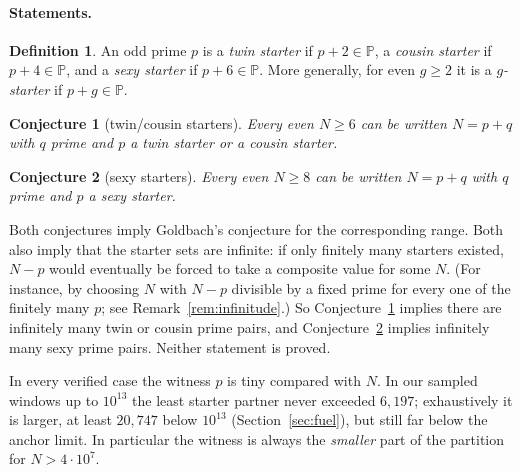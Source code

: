\documentclass[11pt]{article}
\newtheorem{conjecture}{Conjecture}
\theoremstyle{definition}
\newtheorem{definition}[theorem]{Definition}
\theoremstyle{remark}
\newcommand{\Pp}{\mathbb{P}}
\begin{document}
\paragraph{Statements.}

\begin{definition}
An odd prime $p$ is a \emph{twin starter} if $p+2\in\Pp$, a \emph{cousin
starter} if $p+4\in\Pp$, and a \emph{sexy starter} if $p+6\in\Pp$. More
generally, for even $g\ge 2$ it is a \emph{$g$-starter} if $p+g\in\Pp$.
\end{definition}

\begin{conjecture}[twin/cousin starters]\label{conj:A}
Every even $N\ge 6$ can be written $N=p+q$ with $q$ prime and $p$ a twin
starter or a cousin starter.
\end{conjecture}

\begin{conjecture}[sexy starters]\label{conj:B}
Every even $N\ge 8$ can be written $N=p+q$ with $q$ prime and $p$ a sexy
starter.
\end{conjecture}

Both conjectures imply Goldbach's conjecture for the corresponding range. Both
also imply that the starter sets are infinite: if only finitely many starters
existed, $N-p$ would eventually be forced to take a composite value for some $N$.
(For instance, by choosing $N$ with $N-p$ divisible by a fixed prime for every
one of the finitely many $p$; see Remark~\ref{rem:infinitude}.) So
Conjecture~\ref{conj:A} implies there are infinitely many twin or cousin
prime pairs, and Conjecture~\ref{conj:B} implies infinitely many sexy prime
pairs. Neither statement is proved.

In every verified case the witness $p$ is tiny compared with $N$. In our sampled
windows up to $10^{13}$ the least starter partner never exceeded $6{,}197$; exhaustively
it is larger, at least $20{,}747$ below $10^{13}$ (Section~\ref{sec:fuel}), but still far
below the anchor limit. In particular the witness is always the
\emph{smaller} part of the partition for $N>4\cdot 10^7$.
\end{document}
